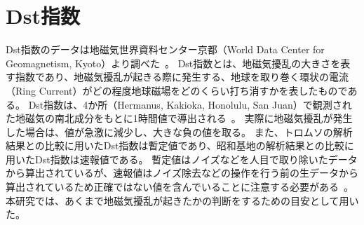 \chapter{Dst指数}
\label{app:dst}
Dst指数のデータは地磁気世界資料センター京都（World Data Center for Geomagnetism, Kyoto）より調べた~\cite{wdc2022creditdst}。
Dst指数とは、地磁気擾乱の大きさを表す指数であり、地磁気擾乱が起きる際に発生する、地球を取り巻く環状の電流（Ring Current）がどの程度地球磁場をどのくらい打ち消すかを表したものである。
Dst指数は、4か所（Hermanus, Kakioka, Honolulu, San Juan）で観測された地磁気の南北成分をもとに1時間値で導出される~\cite{sugiura1986dst}。
実際に地磁気擾乱が発生した場合は、値が急激に減少し、大きな負の値を取る。
また、トロムソの解析結果との比較に用いたDst指数は暫定値であり、昭和基地の解析結果との比較に用いたDst指数は速報値である。
暫定値はノイズなどを人目で取り除いたデータから算出されているが、速報値はノイズ除去などの操作を行う前の生データから算出されているため正確ではない値を含んでいることに注意する必要がある~\cite{wdc2022aedst}。
本研究では、あくまで地磁気擾乱が起きたかの判断をするための目安として用いた。

